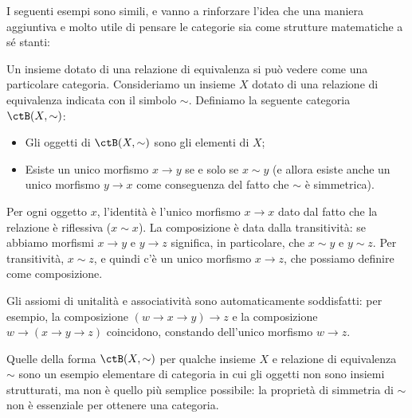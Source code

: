 I seguenti esempi sono simili, e vanno a rinforzare l'idea che una maniera aggiuntiva e molto utile di pensare le categorie sia come strutture matematiche a sé stanti:
\begin{example}\label{ex_cat_rel_equiv}
	Un insieme dotato di una relazione di equivalenza si può vedere come una particolare categoria. Consideriamo un insieme \(X\) dotato di una relazione di equivalenza indicata con il simbolo \(\sim\).
	Definiamo la seguente categoria \(\ctB(X,\sim)\):
	\begin{itemize}
		\item Gli oggetti di \(\ctB(X,\sim)\) sono gli elementi di \(X\);
		\item Esiste un unico morfismo \(x\to y\) se e solo se \(x\sim y\) (e allora esiste anche un unico morfismo \(y\to x\) come conseguenza del fatto che \(\sim\) è simmetrica).
	\end{itemize}
	Per ogni oggetto \(x\), l'identità è l'unico morfismo \(x\to x\) dato dal fatto che la relazione è riflessiva (\(x\sim x\)).
	La composizione è data dalla transitività: se abbiamo morfismi \(x\to y\) e \(y\to z\) significa, in particolare, che \(x\sim y\) e \(y\sim z\). Per transitività, \(x\sim z\), e quindi c'è un unico morfismo \(x\to z\), che possiamo definire come composizione.

	Gli assiomi di unitalità e associatività sono automaticamente soddisfatti: per esempio, la composizione \((w\to x\to y)\to z\) e la composizione \(w\to (x\to y\to z)\) coincidono, constando dell'unico morfismo \(w\to z\).
\end{example}
Quelle della forma \(\ctB(X,\sim)\) per qualche insieme \(X\) e relazione di equivalenza \(\sim\) sono un esempio elementare di categoria in cui gli oggetti non sono insiemi strutturati, ma non è quello più semplice possibile: la proprietà di simmetria di \(\sim\) non è essenziale per ottenere una categoria.


